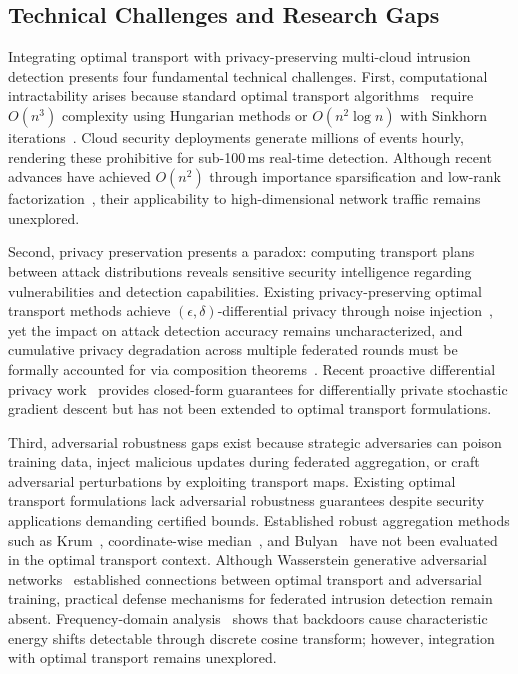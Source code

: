 \documentclass{ieeeaccess}
\theoremstyle{plain}
\theoremstyle{definition}
\theoremstyle{remark}
\begin{document}
\subsection{Technical Challenges and Research Gaps}

Integrating optimal transport with privacy-preserving multi-cloud intrusion detection presents four fundamental technical challenges. First, computational intractability arises because standard optimal transport algorithms~\cite{villani2008,kantorovich1942} require $O(n^3)$ complexity using Hungarian methods or $O(n^2 \log n)$ with Sinkhorn iterations~\cite{cuturi2013,altschuler2017}. Cloud security deployments generate millions of events hourly, rendering these prohibitive for sub-100\,ms real-time detection. Although recent advances have achieved $O(n^2)$ through importance sparsification and low-rank factorization~\cite{scetbon2024}, their applicability to high-dimensional network traffic remains unexplored.

Second, privacy preservation presents a paradox: computing transport plans between attack distributions reveals sensitive security intelligence regarding vulnerabilities and detection capabilities. Existing privacy-preserving optimal transport methods achieve $(\epsilon, \delta)$-differential privacy through noise injection~\cite{dwork2006}, yet the impact on attack detection accuracy remains uncharacterized, and cumulative privacy degradation across multiple federated rounds must be formally accounted for via composition theorems~\cite{mironov2017,balle2020}. Recent proactive differential privacy work~\cite{vandijk2024} provides closed-form guarantees for differentially private stochastic gradient descent but has not been extended to optimal transport formulations.

Third, adversarial robustness gaps exist because strategic adversaries can poison training data, inject malicious updates during federated aggregation, or craft adversarial perturbations by exploiting transport maps. Existing optimal transport formulations lack adversarial robustness guarantees despite security applications demanding certified bounds. Established robust aggregation methods such as Krum~\cite{blanchard2017}, coordinate-wise median~\cite{yin2018}, and Bulyan~\cite{guerraoui2018} have not been evaluated in the optimal transport context. Although Wasserstein generative adversarial networks~\cite{arjovsky2017} established connections between optimal transport and adversarial training, practical defense mechanisms for federated intrusion detection remain absent. Frequency-domain analysis~\cite{fereidooni2024} shows that backdoors cause characteristic energy shifts detectable through discrete cosine transform; however, integration with optimal transport remains unexplored.
\end{document}
